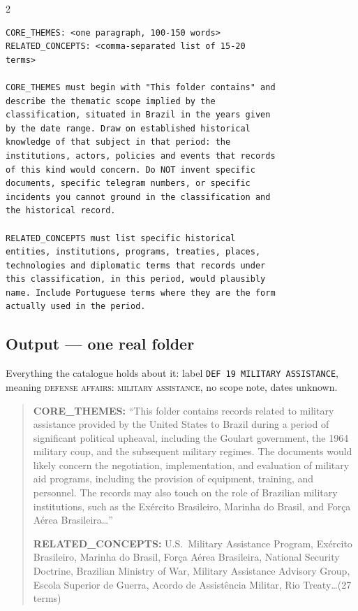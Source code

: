 \documentclass[a4paper,11pt]{article}
\begin{document}
\begin{multicols}{2}
{\begin{verbatim}
CORE_THEMES: <one paragraph, 100-150 words>
RELATED_CONCEPTS: <comma-separated list of 15-20
terms>

CORE_THEMES must begin with "This folder contains" and
describe the thematic scope implied by the
classification, situated in Brazil in the years given
by the date range. Draw on established historical
knowledge of that subject in that period: the
institutions, actors, policies and events that records
of this kind would concern. Do NOT invent specific
documents, specific telegram numbers, or specific
incidents you cannot ground in the classification and
the historical record.

RELATED_CONCEPTS must list specific historical
entities, institutions, programs, treaties, places,
technologies and diplomatic terms that records under
this classification, in this period, would plausibly
name. Include Portuguese terms where they are the form
actually used in the period.
\end{verbatim}
}

\subsection*{Output --- one real folder}

Everything the catalogue holds about it: label \texttt{DEF 19 MILITARY ASSISTANCE}, meaning
\textsc{defense affairs: military assistance}, no scope note, dates unknown.

\begin{quote}
\textbf{CORE\_THEMES:} ``This folder contains records related to military assistance provided
by the United States to Brazil during a period of significant political upheaval, including
the Goulart government, the 1964 military coup, and the subsequent military regimes. The
documents would likely concern the negotiation, implementation, and evaluation of military
aid programs, including the provision of equipment, training, and personnel. The records may
also touch on the role of Brazilian military institutions, such as the Ex\'ercito Brasileiro,
Marinha do Brasil, and For\c{c}a A\'erea Brasileira\ldots''

\textbf{RELATED\_CONCEPTS:} U.S.\ Military Assistance Program, Ex\'ercito Brasileiro, Marinha
do Brasil, For\c{c}a A\'erea Brasileira, National Security Doctrine, Brazilian Ministry of
War, Military Assistance Advisory Group, Escola Superior de Guerra, Acordo de Assist\^encia
Militar, Rio Treaty\ldots (27 terms)
\end{quote}


\end{multicols}
\end{document}

